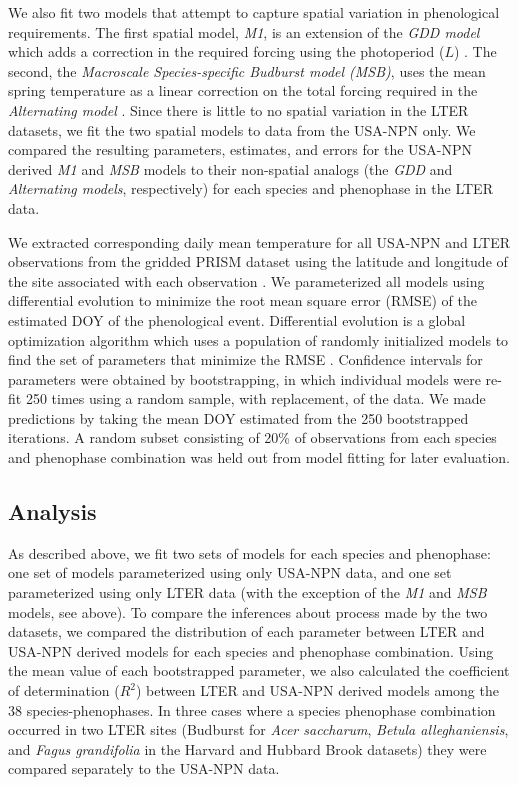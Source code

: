\documentclass[fleqn,12pt,lineno]{article}
\begin{document}
We also fit two models that attempt to capture spatial variation in phenological requirements. The first spatial model, \textit{M1}, is an extension of the \textit{GDD model} which adds a correction in the required forcing using the photoperiod ($L$) \citep{blumel2012}. The second, the \textit{Macroscale Species-specific Budburst model (MSB)}, uses the mean spring temperature as a linear correction on the total forcing required in the \textit{Alternating model} \citep{jeong2013}. Since there is little to no spatial variation in the LTER datasets, we fit the two spatial models to data from the USA-NPN only. We compared the resulting parameters, estimates, and errors for the USA-NPN derived \textit{M1} and \textit{MSB} models to their non-spatial analogs (the \textit{GDD} and \textit{Alternating models}, respectively) for each species and phenophase in the LTER data.  

We extracted corresponding daily mean temperature for all USA-NPN and LTER observations from the gridded PRISM dataset using the latitude and longitude of the site associated with each observation \citep{prismdata}. We parameterized all models using differential evolution to minimize the root mean square error (RMSE) of the estimated DOY of the phenological event. Differential evolution is a global optimization algorithm which uses a population of randomly initialized models to find the set of parameters that minimize the RMSE \citep{storn1997}. Confidence intervals for parameters were obtained by bootstrapping, in which individual models were re-fit 250 times using a random sample, with replacement, of the data. We made predictions by taking the mean DOY estimated from the 250 bootstrapped iterations. A random subset consisting of 20\% of observations from each species and phenophase combination was held out from model fitting for later evaluation.

\subsection*{Analysis}

As described above, we fit two sets of models for each species and phenophase: one set of models parameterized using only USA-NPN data, and one set parameterized using only LTER data (with the exception of the \textit{M1} and \textit{MSB} models, see above). To compare the inferences about process made by the two datasets, we compared the distribution of each parameter between LTER and USA-NPN derived models for each species and phenophase combination. Using the mean value of each bootstrapped parameter, we also calculated the coefficient of determination ($R^2$) between LTER and USA-NPN derived models among the 38 species-phenophases. In three cases where a species phenophase combination occurred in two LTER sites (Budburst for \textit{Acer saccharum}, \textit{Betula alleghaniensis}, and \textit{Fagus grandifolia} in the Harvard and Hubbard Brook datasets) they were compared separately to the USA-NPN data.
\end{document}
